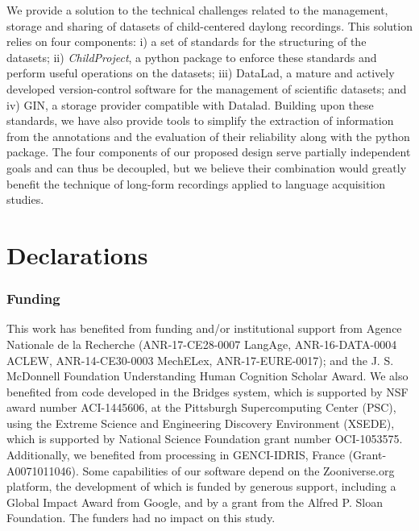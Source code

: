 \documentclass[smallextended]{svjour3}       %
\begin{document}

We provide a solution to the technical challenges related to the management, storage and sharing of datasets of child-centered daylong recordings. This solution relies on four components: i) a set of standards for the structuring of the datasets; ii) \emph{ChildProject}, a python package to enforce these standards and perform useful operations on the datasets; iii) DataLad, a mature and actively developed version-control software for the management of scientific datasets; and iv) GIN, a storage provider compatible with Datalad. Building upon these standards, we have also provide tools to simplify the extraction of information from the annotations and the evaluation of their reliability along with the python package. The four components of our proposed design serve partially independent goals and can thus be decoupled, but we believe their combination would greatly benefit the technique of long-form recordings applied to language acquisition studies.

\section*{Declarations}

\subsubsection*{Funding} 
This work has benefited from funding and/or institutional support from Agence Nationale de la Recherche (ANR-17-CE28-0007 LangAge,
ANR-16-DATA-0004 ACLEW, ANR-14-CE30-0003 MechELex, ANR-17-EURE-0017);
and the J. S. McDonnell Foundation Understanding Human Cognition Scholar Award. We also benefited from code developed in the Bridges system, which is
supported by NSF award number ACI-1445606, at the Pittsburgh
Supercomputing Center (PSC), using the Extreme Science and Engineering Discovery Environment
(XSEDE), which is supported by National Science Foundation grant number OCI-1053575. Additionally, we benefited from processing in GENCI-IDRIS, France (Grant-A0071011046). Some capabilities of our software depend on  the Zooniverse.org platform, the development of which is funded by generous support, including a Global Impact Award from Google, and by a grant from the Alfred P. Sloan Foundation. The funders had no impact on this study.
\end{document}
